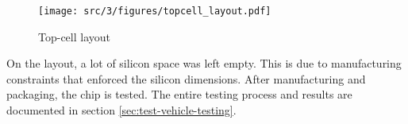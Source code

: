 \begin{figure}[!h]
  \centering
  \texttt{[image: src/3/figures/topcell\_layout.pdf]}
  \caption{Top-cell layout}
  \label{fig:top-cell-layout}
\end{figure}

On the layout, a lot of silicon space was left empty.
This is due to manufacturing constraints that enforced the silicon dimensions.
After manufacturing and packaging, the chip is tested.
The entire testing process and results are documented in section \ref{sec:test-vehicle-testing}.
